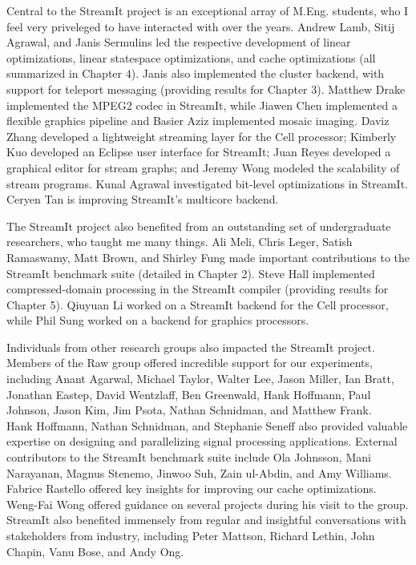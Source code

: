 Central to the StreamIt project is an exceptional array of
M.Eng. students, who I feel very priveleged to have interacted with
over the years.  Andrew Lamb, Sitij Agrawal, and Janis Sermulins led
the respective development of linear optimizations, linear statespace
optimizations, and cache optimizations (all summarized in Chapter 4).
Janis also implemented the cluster backend, with support for teleport
messaging (providing results for Chapter 3).  Matthew Drake
implemented the MPEG2 codec in StreamIt, while Jiawen Chen implemented
a flexible graphics pipeline and Basier Aziz implemented mosaic
imaging.  Daviz Zhang developed a lightweight streaming layer for the
Cell processor; Kimberly Kuo developed an Eclipse user interface for
StreamIt; Juan Reyes developed a graphical editor for stream graphs;
and Jeremy Wong modeled the scalability of stream programs.  Kunal
Agrawal investigated bit-level optimizations in StreamIt.  Ceryen Tan
is improving StreamIt's multicore backend.

The StreamIt project also benefited from an outstanding set of
undergraduate researchers, who taught me many things.  Ali Meli, Chris
Leger, Satish Ramaswamy, Matt Brown, and Shirley Fung made important
contributions to the StreamIt benchmark suite (detailed in Chapter 2).
Steve Hall implemented compressed-domain processing in the StreamIt
compiler (providing results for Chapter 5).  Qiuyuan Li worked on a
StreamIt backend for the Cell processor, while Phil Sung worked on a
backend for graphics processors.

Individuals from other research groups also impacted the StreamIt
project.  Members of the Raw group offered incredible support for our
experiments, including Anant Agarwal, Michael Taylor, Walter Lee,
Jason Miller, Ian Bratt, Jonathan Eastep, David Wentzlaff, Ben
Greenwald, Hank Hoffmann, Paul Johnson, Jason Kim, Jim Psota, Nathan
Schnidman, and Matthew Frank.
%
\newpage
\enlargethispage{0.3\baselineskip}
%
~ \vspace{-1.3\baselineskip}\\
\noindent Hank Hoffmann, Nathan Schnidman, and Stephanie Seneff also
provided valuable expertise on designing and parallelizing signal
processing applications.  External contributors to the StreamIt
benchmark suite include Ola Johnsson, Mani Narayanan, Magnus
Stenemo, Jinwoo Suh, Zain ul-Abdin, and Amy Williams.  Fabrice
Rastello offered key insights for improving our cache optimizations.
Weng-Fai Wong offered guidance on several projects during his visit
to the group.  StreamIt also benefited immensely from regular and
insightful conversations with stakeholders from industry, including
Peter Mattson, Richard Lethin, John Chapin, Vanu Bose, and Andy Ong.

